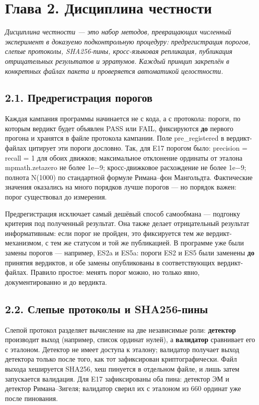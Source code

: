 \documentclass[11pt,a4paper]{article}
\begin{document}
\section{Глава 2. Дисциплина честности}

\noindent\textit{\color{copper}Дисциплина честности — это набор методов, превращающих численный эксперимент в доказуемо подконтрольную процедуру: предрегистрация порогов, слепые протоколы, SHA256-пины, кросс-языковая репликация, публикация отрицательных результатов и эрратумов. Каждый принцип закреплён в конкретных файлах пакета и проверяется автоматикой целостности.}

\subsection{2.1. Предрегистрация порогов}

Каждая кампания программы начинается не с кода, а с протокола: пороги, по которым вердикт будет объявлен PASS или FAIL, фиксируются \textbf{до} первого прогона и хранятся в файле протокола кампании. Поле pre\_registered в вердикт-файлах цитирует эти пороги дословно. Так, для E17 порогом было: precision = recall = 1 для обоих движков; максимальное отклонение ординаты от эталона mpmath.zetazero не более 1e−9; кросс-движковое расхождение не более 1e−9; полнота N(1000) по стандартной формуле Римана–фон Мангольдта. Фактические значения оказались на много порядков лучше порогов — но порядок важен: порог существовал до измерения.

Предрегистрация исключает самый дешёвый способ самообмана — подгонку критерия под полученный результат. Она также делает отрицательный результат информативным: если порог не пройден, это фиксируется тем же вердикт-механизмом, с тем же статусом и той же публикацией. В программе уже были замены порогов — например, ES2a и ES5a: пороги ES2 и ES5 были заменены \textbf{до} принятия вердиктов, и обе замены опубликованы в соответствующих вердикт-файлах. Правило простое: менять порог можно, но только явно, документированно и до вердикта.

\subsection{2.2. Слепые протоколы и SHA256-пины}

Слепой протокол разделяет вычисление на две независимые роли: \textbf{детектор} производит выход (например, список ординат нулей), а \textbf{валидатор} сравнивает его с эталоном. Детектор не имеет доступа к эталону; валидатор получает выход детектора только после того, как тот зафиксирован криптографически. Файл выхода хешируется SHA256, хеш пинуется в отдельном файле, и лишь затем запускается валидация. Для E17 зафиксированы оба пина: детектор ЭМ и детектор Римана–Зигеля; валидатор сверил их с эталоном из 660 ординат уже после пинования.
\end{document}
